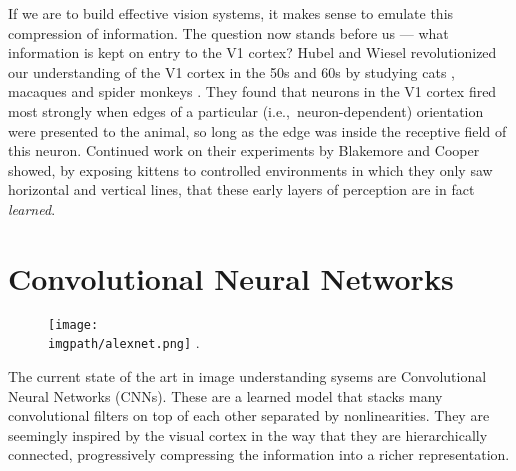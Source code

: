If we are to build effective vision systems, it makes sense to emulate this
compression of information.
The question now stands before us --- what information is kept on entry to the V1 cortex?
Hubel and Wiesel revolutionized our understanding of the V1 cortex in the 50s and 60s by 
studying cats \cite{hubel_receptive_1959, hubel_receptive_1962}, macaques and spider 
monkeys \cite{hubel_receptive_1968}. They found that neurons in the V1 cortex fired
most strongly when edges of a particular (i.e.,\ neuron-dependent) orientation
were presented to the animal, so long as the edge was inside the receptive field of
this neuron.
Continued work on their experiments by Blakemore and Cooper
\cite{blakemore_development_1970} showed, by exposing
kittens to controlled environments in which they only saw horizontal and
vertical lines, that these early layers of perception are in fact \emph{learned}. 

\section{Convolutional Neural Networks}
\begin{figure}
  \centering
    \texttt{[image: \\imgpath/alexnet.png]}
    .
    \label{fig:ch1:cnn_arch}
  \end{figure}
The current state of the art in image understanding sysems are 
Convolutional Neural Networks (CNNs). These are a learned model that
stacks many convolutional filters on top of each other separated by
nonlinearities. 
They are seemingly inspired by the visual cortex in the way that they are
hierarchically connected, progressively compressing the information into a
richer representation. 

